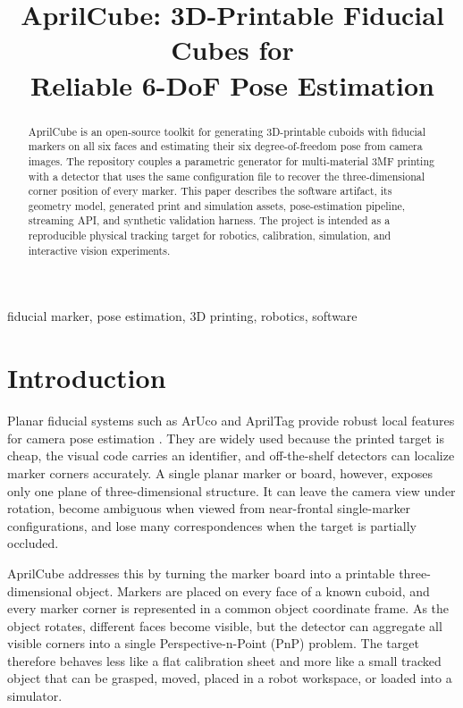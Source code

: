 \documentclass[conference]{IEEEtran}
\begin{document}
\title{AprilCube: 3D-Printable Fiducial Cubes for \\Reliable 6-DoF Pose Estimation}

\author{
}

\maketitle

\begin{abstract}
AprilCube is an open-source toolkit for generating 3D-printable cuboids with fiducial markers on all six faces and estimating their six degree-of-freedom pose from camera images. The repository couples a parametric generator for multi-material 3MF printing with a detector that uses the same configuration file to recover the three-dimensional corner position of every marker. This paper describes the software artifact, its geometry model, generated print and simulation assets, pose-estimation pipeline, streaming API, and synthetic validation harness. The project is intended as a reproducible physical tracking target for robotics, calibration, simulation, and interactive vision experiments.
\end{abstract}

\begin{IEEEkeywords}
fiducial marker, pose estimation, 3D printing, robotics, software
\end{IEEEkeywords}

\section{Introduction}
Planar fiducial systems such as ArUco and AprilTag provide robust local features for camera pose estimation \cite{aruco,apriltag}. They are widely used because the printed target is cheap, the visual code carries an identifier, and off-the-shelf detectors can localize marker corners accurately. A single planar marker or board, however, exposes only one plane of three-dimensional structure. It can leave the camera view under rotation, become ambiguous when viewed from near-frontal single-marker configurations, and lose many correspondences when the target is partially occluded.

AprilCube addresses this by turning the marker board into a printable three-dimensional object. Markers are placed on every face of a known cuboid, and every marker corner is represented in a common object coordinate frame. As the object rotates, different faces become visible, but the detector can aggregate all visible corners into a single Perspective-n-Point (PnP) problem. The target therefore behaves less like a flat calibration sheet and more like a small tracked object that can be grasped, moved, placed in a robot workspace, or loaded into a simulator.
\end{document}
